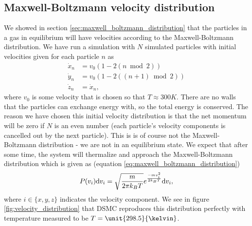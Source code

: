 \subsection{Maxwell-Boltzmann velocity distribution}
We showed in section \ref{sec:maxwell_boltzmann_distribution} that the particles in a gas in equilibrium will have velocities according to the Maxwell-Boltzmann distribution. We have run a simulation with $N$ simulated particles with initial velocities given for each particle $n$ as
\begin{align}
	\nonumber
	\dot x_n &= v_0(1 - 2 (n\bmod 2))\\
	\label{eq:weird_velocity_distribution}
	\dot y_n &= v_0(1 - 2 ((n+1)\bmod 2))\\
	\nonumber
	\dot z_n &= \dot x_n,
\end{align}
where $v_0$ is some velocity that is chosen so that $T\approx 300K$. There are no walls that the particles can exchange energy with, so the total energy is conserved. The reason we have chosen this initial velocity distribution is that the net momentum will be zero if $N$ is an even number (each particle's velocity components is cancelled out by the next particle). This is is of course not the Maxwell-Boltzmann distribution - we are not in an equilibrium state. We expect that after some time, the system will thermalize and approach the Maxwell-Boltzmann distribution which is given as (equation \eqref{eq:maxwell_boltzmann_distribution})
\begin{align}
	P(v_i)\mathrm{d}v_i = \sqrt{m\over 2\pi k_BT}e^{-mv_i^2\over 2k_BT}\mathrm{d}v_i,
\end{align}
where $i\in \{x,y,z\}$ indicates the velocity component. We see in figure \ref{fig:velocity_distribution} that DSMC reproduces this distribution perfectly with temperature measured to be $T=\unit{298.5}{\kelvin}$. 
